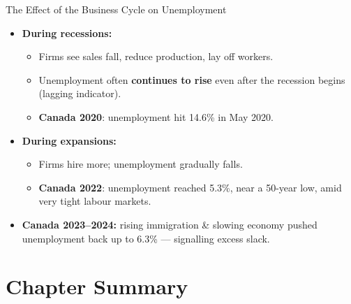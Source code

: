\documentclass[aspectratio=169]{beamer}
\begin{document}
\begin{frame}{The Effect of the Business Cycle on Unemployment}
\transfade
\begin{itemize}
  \item \textbf{During recessions:}
  \begin{itemize}
    \item Firms see sales fall, reduce production, lay off workers.
    \item Unemployment often \textbf{continues to rise} even after the recession begins (lagging indicator).
    \item \textbf{Canada 2020}: unemployment hit \alert{14.6\%} in May 2020.
  \end{itemize}
  \item \textbf{During expansions:}
  \begin{itemize}
    \item Firms hire more; unemployment gradually falls.
    \item \textbf{Canada 2022}: unemployment reached \alert{5.3\%}, near a 50-year low, amid very tight labour markets.
  \end{itemize}
  \item \textbf{Canada 2023--2024:} rising immigration \& slowing economy pushed unemployment back up to \alert{6.3\%} --- signalling excess slack.
\end{itemize}
\end{frame}

\section*{Chapter Summary}
\end{document}
